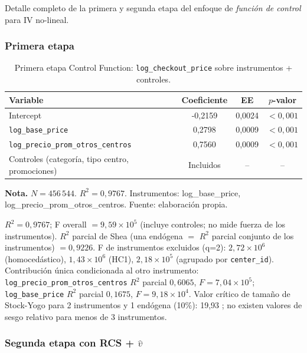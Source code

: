 \documentclass[doc, a4paper, biblatex, floatsintext, longtable, babel]{apa7}
\begin{document}
Detalle completo de la primera y segunda etapa del enfoque de \textit{función de control} para IV no-lineal.

\subsubsection{Primera etapa}
\label{subsubsec:appendix_cf_first}

\begin{table}[!htbp]
\centering
\caption{Primera etapa Control Function: \texttt{log\_checkout\_price} sobre instrumentos + controles.}
\label{tab:appendix_cf_first}
\footnotesize
\begin{threeparttable}
\begin{tabular}{lccc}
\toprule
Variable & Coeficiente & EE & $p$-valor \\
\midrule
Intercept & -0,2159 & 0,0024 & $<0,001$ \\
\texttt{log\_base\_price} & 0,2798 & 0,0009 & $<0,001$ \\
\texttt{log\_precio\_prom\_otros\_centros} & 0,7560 & 0,0009 & $<0,001$ \\
Controles (categoría, tipo centro, promociones) & Incluidos & -- & -- \\
\bottomrule
\end{tabular}
\begin{tablenotes}
\footnotesize
\item \textbf{Nota.} $N = 456\,544$. $R^2 = 0,9767$. Instrumentos: log\_base\_price, log\_precio\_prom\_otros\_centros. Fuente: elaboración propia.
\end{tablenotes}
\end{threeparttable}
\end{table}

$R^2 = 0,9767$; F overall $= 9,59 \times 10^5$ (incluye controles; no mide fuerza de los instrumentos). $R^2$ parcial de Shea (una endógena $=$ $R^2$ parcial conjunto de los instrumentos) $=0,9226$. F de instrumentos excluidos (q=2): $2,72 \times 10^6$ (homocedástico), $1,43\times10^6$ (HC1), $2,18 \times 10^5$ (agrupado por \texttt{center\_id}). Contribución única condicionada al otro instrumento: \texttt{log\_precio\_prom\_otros\_centros} $R^2$ parcial $0,6065$, $F=7,04 \times 10^5$; \texttt{log\_base\_price} $R^2$ parcial $0,1675$, $F=9,18 \times 10^4$. Valor crítico de tamaño de Stock-Yogo para 2 instrumentos y 1 endógena (10\%): 19,93 \parencite{stock2005testing}; no existen valores de sesgo relativo para menos de 3 instrumentos.

\subsubsection{Segunda etapa con RCS + $\hat{v}$}
\label{subsubsec:appendix_cf_second}
\end{document}
